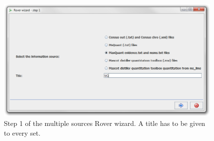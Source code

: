 \documentclass[11pt,a4paper,oneside,notitlepage]{book}
\begin{document}
\begin{figure}[H]
\begin{center}
\includegraphics[scale=0.4]{Rover_wizard_-_step_1_M.png}
\caption{Step 1 of the multiple sources Rover wizard. A title has to be given to every set.}
\label{step1_M}
\end{center}
\end{figure}
\end{document}
